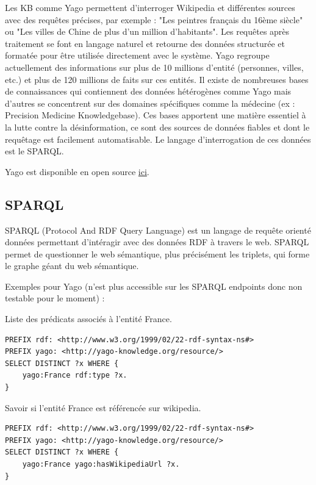 Les KB comme Yago permettent d'interroger Wikipedia et différentes sources avec des requêtes précises, par exemple : "Les peintres français du 16ème siècle" ou "Les villes de Chine de plus d'un million d'habitants". Les requêtes après traitement se font en langage naturel et retourne des données structurée et formatée pour être utilisée directement avec le système. Yago regroupe actuellement des informations sur plus de 10 millions d'entité (personnes, villes, etc.) et plus de 120 millions de faits sur ces entités. 
Il existe de nombreuses bases de connaissances qui contiennent des données hétérogènes comme Yago mais d'autres se concentrent sur des domaines spécifiques comme la médecine (ex : Precision Medicine Knowledgebase). Ces bases apportent une matière essentiel à la lutte contre la désinformation, ce sont des sources de données fiables et dont le requêtage est facilement automatisable.
Le langage d'interrogation de ces données est le SPARQL.

Yago est disponible en open source \href{https://github.com/yago-naga/yago3}{ici}.

\iffalse
\subsection{SPARQL}

SPARQL (Protocol And RDF Query Language) est un langage de requête orienté données permettant d'intéragir avec des données RDF à travers le web. SPARQL permet de questionner le web sémantique, plus précisément les triplets, qui forme le graphe géant du web sémantique.

Exemples pour Yago (n'est plus accessible sur les SPARQL endpoints donc non testable pour le moment) :

Liste des prédicats associés à l'entité France.

\begin{lstlisting}[language=SPARQL, backgroundcolor=\color{lightgray}]
PREFIX rdf: <http://www.w3.org/1999/02/22-rdf-syntax-ns#> 
PREFIX yago: <http://yago-knowledge.org/resource/>
SELECT DISTINCT ?x WHERE {
    yago:France rdf:type ?x.
}
\end{lstlisting}

\iffalse
Savoir si l'entité France est référencée sur wikipedia.

\begin{lstlisting}[language=SPARQL, backgroundcolor=\color{lightgray}]
PREFIX rdf: <http://www.w3.org/1999/02/22-rdf-syntax-ns#> 
PREFIX yago: <http://yago-knowledge.org/resource/>
SELECT DISTINCT ?x WHERE {
    yago:France yago:hasWikipediaUrl ?x.
}
\end{lstlisting}

